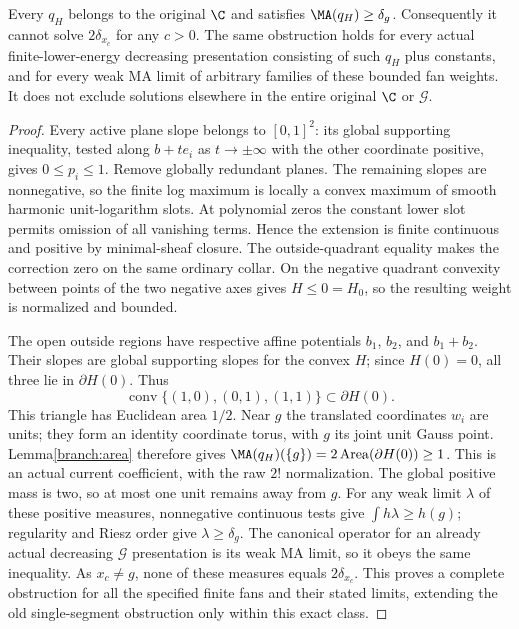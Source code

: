 \begin{theorem}\label{branch:fanobstruction}
Every $q_H$ belongs to the original $\C$ and satisfies
$\MA(q_H)\ge\delta_g$. Consequently it cannot solve $2\delta_{x_c}$
for any $c>0$. The same obstruction holds for every actual
finite-lower-energy decreasing presentation consisting of such $q_H$
plus constants, and for every weak MA limit of arbitrary families of
these bounded fan weights. It does not exclude solutions elsewhere in
the entire original $\C$ or $\mathcal G$.
\end{theorem}
\begin{proof}
Every active plane slope belongs to $[0,1]^2$: its global supporting
inequality, tested along $b+t e_i$ as $t\to\pm\infty$ with the other
coordinate positive, gives $0\le p_i\le1$. Remove globally redundant
planes. The remaining slopes are nonnegative, so the finite log maximum
is locally a convex maximum of smooth harmonic unit-logarithm slots.
At polynomial zeros the constant lower slot permits omission of all
vanishing terms. Hence the extension is finite continuous and positive
by minimal-sheaf closure. The outside-quadrant equality makes the correction
zero on the same ordinary collar. On the negative quadrant convexity
between points of the two negative axes gives $H\le0=H_0$, so the resulting
weight is normalized and bounded.

The open outside regions have respective affine potentials $b_1$, $b_2$,
and $b_1+b_2$. Their slopes are global supporting slopes for the convex
$H$; since $H(0)=0$, all three lie in $\partial H(0)$. Thus
\[
 \operatorname{conv}\{(1,0),(0,1),(1,1)\}\subset\partial H(0).
\]
This triangle has Euclidean area $1/2$. Near $g$ the translated coordinates
$w_i$ are units; they form an identity coordinate torus, with $g$ its joint
unit Gauss point. Lemma\ref{branch:area} therefore gives
$\MA(q_H)(\{g\})=2\operatorname{Area}(\partial H(0))\ge1$.
This is an actual current coefficient, with the raw $2!$ normalization.
The global positive mass is two, so at most one unit remains away from $g$.
For any weak limit $\lambda$ of these positive measures, nonnegative
continuous tests give $\int h\lambda\ge h(g)$; regularity and Riesz order
give $\lambda\ge\delta_g$. The canonical operator for an already actual
decreasing $\mathcal G$ presentation is its weak MA limit, so it obeys the
same inequality. As $x_c\ne g$, none of these measures equals $2\delta_{x_c}$.
This proves a complete obstruction for all the specified finite fans and
their stated limits, extending the old single-segment obstruction only
within this exact class.
\end{proof}

